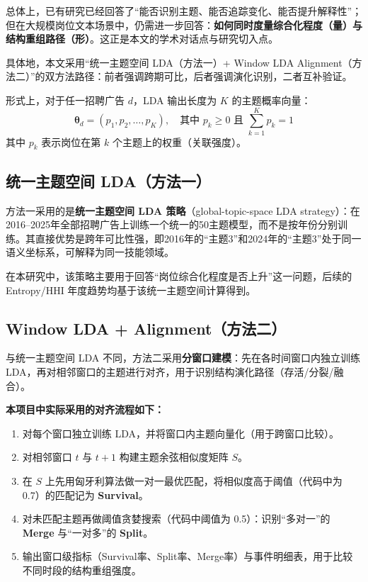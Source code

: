\documentclass[12pt, a4paper, fontset=none]{ctexart}
\begin{document}
总体上，已有研究已经回答了“能否识别主题、能否追踪变化、能否提升解释性”；但在大规模岗位文本场景中，仍需进一步回答：\textbf{如何同时度量综合化程度（量）与结构重组路径（形）}。这正是本文的学术对话点与研究切入点。

具体地，本文采用“统一主题空间 LDA（方法一）+ Window LDA Alignment（方法二）”的双方法路径：前者强调跨期可比，后者强调演化识别，二者互补验证。

形式上，对于任一招聘广告 \(d\)，LDA 输出长度为 \(K\) 的主题概率向量：
\[
    \boldsymbol{\theta}_d = (p_1, p_2, \ldots, p_K), \quad \text{其中 } p_k \geq 0 \text{ 且 } \sum_{k=1}^{K} p_k = 1
\]
其中 \(p_k\) 表示岗位在第 \(k\) 个主题上的权重（关联强度）。

\subsection{统一主题空间 LDA（方法一）}

方法一采用的是\textbf{统一主题空间 LDA 策略}（global-topic-space LDA strategy）：在2016--2025年全部招聘广告上训练一个统一的50主题模型，而不是按年份分别训练。其直接优势是跨年可比性强，即2016年的“主题3”和2024年的“主题3”处于同一语义坐标系，可解释为同一技能领域。

在本研究中，该策略主要用于回答“岗位综合化程度是否上升”这一问题，后续的 Entropy/HHI 年度趋势均基于该统一主题空间计算得到。

\subsection{Window LDA + Alignment（方法二）}

与统一主题空间 LDA 不同，方法二采用\textbf{分窗口建模}：先在各时间窗口内独立训练 LDA，再对相邻窗口的主题进行对齐，用于识别结构演化路径（存活/分裂/融合）。

\textbf{本项目中实际采用的对齐流程如下：}
\begin{enumerate}
    \item 对每个窗口独立训练 LDA，并将窗口内主题向量化（用于跨窗口比较）。
    \item 对相邻窗口 \(t\) 与 \(t+1\) 构建主题余弦相似度矩阵 \(S\)。
    \item 在 \(S\) 上先用匈牙利算法做一对一最优匹配，将相似度高于阈值（代码中为 0.7）的匹配记为 \textbf{Survival}。
    \item 对未匹配主题再做阈值贪婪搜索（代码中阈值为 0.5）：识别“多对一”的 \textbf{Merge} 与“一对多”的 \textbf{Split}。
    \item 输出窗口级指标（Survival率、Split率、Merge率）与事件明细表，用于比较不同时段的结构重组强度。
\end{enumerate}
\end{document}
